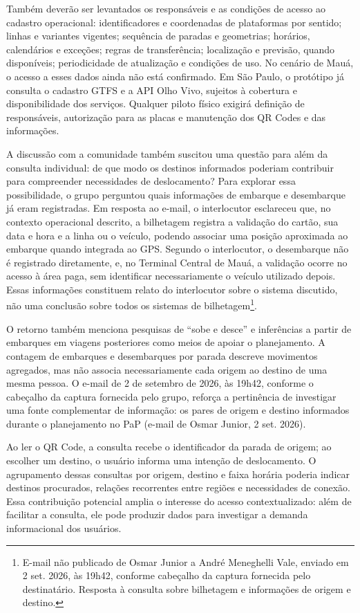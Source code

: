 \documentclass[12pt,oneside,a4paper,brazil,chapter=TITLE]{abntex2}
\begin{document}
Também deverão ser levantados os responsáveis e as condições de acesso ao cadastro operacional: identificadores e coordenadas de plataformas por sentido; linhas e variantes vigentes; sequência de paradas e geometrias; horários, calendários e exceções; regras de transferência; localização e previsão, quando disponíveis; periodicidade de atualização e condições de uso. No cenário de Mauá, o acesso a esses dados ainda não está confirmado. Em São Paulo, o protótipo já consulta o cadastro GTFS e a API Olho Vivo, sujeitos à cobertura e disponibilidade dos serviços. Qualquer piloto físico exigirá definição de responsáveis, autorização para as placas e manutenção dos QR Codes e das informações.

A discussão com a comunidade também suscitou uma questão para além da consulta individual: de que modo os destinos informados poderiam contribuir para compreender necessidades de deslocamento? Para explorar essa possibilidade, o grupo perguntou quais informações de embarque e desembarque já eram registradas. Em resposta ao e-mail, o interlocutor esclareceu que, no contexto operacional descrito, a bilhetagem registra a validação do cartão, sua data e hora e a linha ou o veículo, podendo associar uma posição aproximada ao embarque quando integrada ao GPS. Segundo o interlocutor, o desembarque não é registrado diretamente, e, no Terminal Central de Mauá, a validação ocorre no acesso à área paga, sem identificar necessariamente o veículo utilizado depois. Essas informações constituem relato do interlocutor sobre o sistema discutido, não uma conclusão sobre todos os sistemas de bilhetagem\footnote{E-mail não publicado de Osmar Junior a André Meneghelli Vale, enviado em 2 set. 2026, às 19h42, conforme cabeçalho da captura fornecida pelo destinatário. Resposta à consulta sobre bilhetagem e informações de origem e destino.}.

O retorno também menciona pesquisas de ``sobe e desce'' e inferências a partir de embarques em viagens posteriores como meios de apoiar o planejamento. A contagem de embarques e desembarques por parada descreve movimentos agregados, mas não associa necessariamente cada origem ao destino de uma mesma pessoa. O e-mail de 2 de setembro de 2026, às 19h42, conforme o cabeçalho da captura fornecida pelo grupo, reforça a pertinência de investigar uma fonte complementar de informação: os pares de origem e destino informados durante o planejamento no PaP (e-mail de Osmar Junior, 2 set. 2026).

Ao ler o QR Code, a consulta recebe o identificador da parada de origem; ao escolher um destino, o usuário informa uma intenção de deslocamento. O agrupamento dessas consultas por origem, destino e faixa horária poderia indicar destinos procurados, relações recorrentes entre regiões e necessidades de conexão. Essa contribuição potencial amplia o interesse do acesso contextualizado: além de facilitar a consulta, ele pode produzir dados para investigar a demanda informacional dos usuários.
\end{document}
